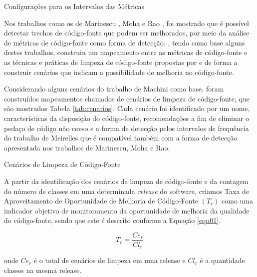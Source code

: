 	\begin{table}[!ht]
	\caption{Configurações para os Intervalos das Métricas}
	\addtolength{\belowcaptionskip}{2pt}
	\begin{center}
		
	\label{tab:good-metrics}
	\end{center}
	\end{table}

Nos trabalhos como os de Marinescu  \cite{marinescu2005measurement}, Moha \cite{moha2010decor} e Rao \cite{rao2007detecting}, foi mostrado que é possível detectar trechos de código-fonte que podem ser melhorados\cite{fowler1999refactoring}, por meio da análise de métricas de código-fonte como forma de detecção. \cite{Machini2010}, tendo como base alguns destes trabalhos, construiu um mapeamento entre as métricas de código-fonte e as técnicas e práticas de limpeza de código-fonte propostas por \cite{Martin2008} e \cite{beck2007implementation} de forma a construir cenários que indicam a possibilidade de melhoria no código-fonte.

Considerando alguns cenários do trabalho de Machini \cite{Machini2010} como base, foram construídos mapeamentos chamados de cenários de limpeza de código-fonte, que são mostrados Tabela \ref{tab:cenarios}. Cada cenário foi identificado por um nome, características da disposição do código-fonte, recomendações a fim de eliminar o pedaço de código não coeso e a forma de detecção pelos intervalos de frequência do trabalho de Meirelles \cite{Meirelles2013} que é compatível também com a forma de detecção apresentada nos trabalhos de Marinescu, Moha e Rao.
	
	\begin{table}[ht]
	\centering
	\caption{Cenários de Limpeza de Código-Fonte}
	\addtolength{\belowcaptionskip}{6pt}
		
	\label{tab:cenarios}
	\end{table}


A partir da identificação dos cenários de limpeza de código-fonte e da contagem do número de classes em uma determinada \textit{release} do software, criamos Taxa de Aproveitamento de Oportunidade de Melhoria de Código-Fonte $(T_r)$ como uma indicador objetivo de monitoramento da oportunidade de melhoria da qualidade do código-fonte, sendo que este é descrito conforme a Equação \ref{eqn01}.

\begin{equation}
\label{eqn01}
T_r =   \frac{{{Ce_r}}}{{Cl_r}}
\end{equation}

onde $ Ce_r $ é o total de cenários de limpeza em uma release e $ Cl_r $ é a quantidade classes na mesma release.
